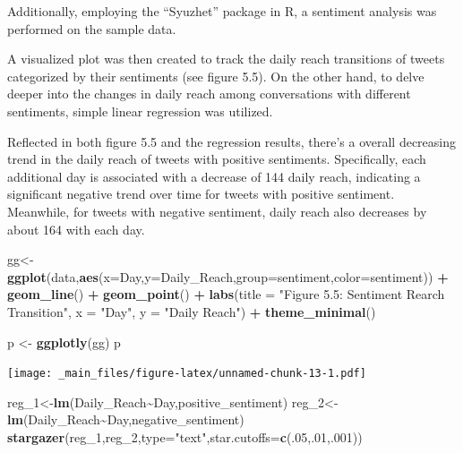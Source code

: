 \documentclass[
]{book}
\newenvironment{Shaded}{\begin{snugshade}}{\end{snugshade}}
\newcommand{\AttributeTok}[1]{\textcolor[rgb]{0.13,0.29,0.53}{#1}}
\newcommand{\DecValTok}[1]{\textcolor[rgb]{0.00,0.00,0.81}{#1}}
\newcommand{\FunctionTok}[1]{\textcolor[rgb]{0.13,0.29,0.53}{\textbf{#1}}}
\newcommand{\NormalTok}[1]{#1}
\newcommand{\OtherTok}[1]{\textcolor[rgb]{0.56,0.35,0.01}{#1}}
\newcommand{\SpecialCharTok}[1]{\textcolor[rgb]{0.81,0.36,0.00}{\textbf{#1}}}
\newcommand{\StringTok}[1]{\textcolor[rgb]{0.31,0.60,0.02}{#1}}
\begin{document}
Additionally, employing the ``Syuzhet'' package in R, a sentiment analysis was performed on the sample data.

A visualized plot was then created to track the daily reach transitions of tweets categorized by their sentiments (see figure 5.5). On the other hand, to delve deeper into the changes in daily reach among conversations with different sentiments, simple linear regression was utilized.

Reflected in both figure 5.5 and the regression results, there's a overall decreasing trend in the daily reach of tweets with positive sentiments. Specifically, each additional day is associated with a decrease of 144 daily reach, indicating a significant negative trend over time for tweets with positive sentiment. Meanwhile, for tweets with negative sentiment, daily reach also decreases by about 164 with each day.

\begin{Shaded}
\begin{Highlighting}[]
\NormalTok{gg}\OtherTok{\textless{}{-}}\FunctionTok{ggplot}\NormalTok{(data,}\FunctionTok{aes}\NormalTok{(}\AttributeTok{x=}\NormalTok{Day,}\AttributeTok{y=}\NormalTok{Daily\_Reach,}\AttributeTok{group=}\NormalTok{sentiment,}\AttributeTok{color=}\NormalTok{sentiment)) }\SpecialCharTok{+}
  \FunctionTok{geom\_line}\NormalTok{() }\SpecialCharTok{+} \FunctionTok{geom\_point}\NormalTok{() }\SpecialCharTok{+}
  \FunctionTok{labs}\NormalTok{(}\AttributeTok{title =} \StringTok{"Figure 5.5: Sentiment Rearch Transition"}\NormalTok{, }\AttributeTok{x =} \StringTok{"Day"}\NormalTok{, }\AttributeTok{y =} \StringTok{"Daily Reach"}\NormalTok{) }\SpecialCharTok{+}
  \FunctionTok{theme\_minimal}\NormalTok{()}

\NormalTok{p }\OtherTok{\textless{}{-}} \FunctionTok{ggplotly}\NormalTok{(gg)}
\NormalTok{p}
\end{Highlighting}
\end{Shaded}

\texttt{[image: \_main\_files/figure-latex/unnamed-chunk-13-1.pdf]}

\begin{Shaded}
\begin{Highlighting}[]
\NormalTok{reg\_1}\OtherTok{\textless{}{-}}\FunctionTok{lm}\NormalTok{(Daily\_Reach}\SpecialCharTok{\textasciitilde{}}\NormalTok{Day,positive\_sentiment)}
\NormalTok{reg\_2}\OtherTok{\textless{}{-}}\FunctionTok{lm}\NormalTok{(Daily\_Reach}\SpecialCharTok{\textasciitilde{}}\NormalTok{Day,negative\_sentiment)}
\FunctionTok{stargazer}\NormalTok{(reg\_1,reg\_2,}\AttributeTok{type=}\StringTok{"text"}\NormalTok{,}\AttributeTok{star.cutoffs=}\FunctionTok{c}\NormalTok{(.}\DecValTok{05}\NormalTok{,.}\DecValTok{01}\NormalTok{,.}\DecValTok{001}\NormalTok{))}
\end{Highlighting}
\end{Shaded}
\end{document}
